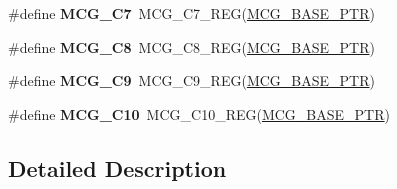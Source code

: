 \begin{DoxyCompactItemize}
\item 
\hypertarget{group___m_c_g___register___accessor___macros_ga9fc6058dcffc6506763ff7235669038c}{}\#define {\bfseries M\+C\+G\+\_\+\+C7}~M\+C\+G\+\_\+\+C7\+\_\+\+R\+E\+G(\hyperlink{group___m_c_g___peripheral_gaceefc72e93a47a35f59a31c57dddf41b}{M\+C\+G\+\_\+\+B\+A\+S\+E\+\_\+\+P\+T\+R})\label{group___m_c_g___register___accessor___macros_ga9fc6058dcffc6506763ff7235669038c}

\item 
\hypertarget{group___m_c_g___register___accessor___macros_ga4328cf0c21c1c85cc0d618f7762016b8}{}\#define {\bfseries M\+C\+G\+\_\+\+C8}~M\+C\+G\+\_\+\+C8\+\_\+\+R\+E\+G(\hyperlink{group___m_c_g___peripheral_gaceefc72e93a47a35f59a31c57dddf41b}{M\+C\+G\+\_\+\+B\+A\+S\+E\+\_\+\+P\+T\+R})\label{group___m_c_g___register___accessor___macros_ga4328cf0c21c1c85cc0d618f7762016b8}

\item 
\hypertarget{group___m_c_g___register___accessor___macros_ga40ae99ab2fbda74612a8f3f6bab361e0}{}\#define {\bfseries M\+C\+G\+\_\+\+C9}~M\+C\+G\+\_\+\+C9\+\_\+\+R\+E\+G(\hyperlink{group___m_c_g___peripheral_gaceefc72e93a47a35f59a31c57dddf41b}{M\+C\+G\+\_\+\+B\+A\+S\+E\+\_\+\+P\+T\+R})\label{group___m_c_g___register___accessor___macros_ga40ae99ab2fbda74612a8f3f6bab361e0}

\item 
\hypertarget{group___m_c_g___register___accessor___macros_gab582a1281f6376c0dd52e62c3e22653e}{}\#define {\bfseries M\+C\+G\+\_\+\+C10}~M\+C\+G\+\_\+\+C10\+\_\+\+R\+E\+G(\hyperlink{group___m_c_g___peripheral_gaceefc72e93a47a35f59a31c57dddf41b}{M\+C\+G\+\_\+\+B\+A\+S\+E\+\_\+\+P\+T\+R})\label{group___m_c_g___register___accessor___macros_gab582a1281f6376c0dd52e62c3e22653e}

\end{DoxyCompactItemize}


\subsection{Detailed Description}
